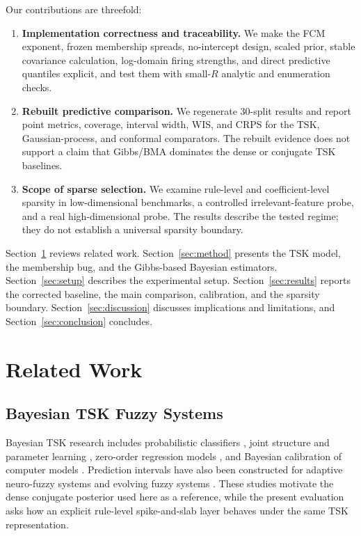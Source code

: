 \documentclass[1p,times]{elsarticle}
\begin{document}
Our contributions are threefold:
\begin{enumerate}
\item \textbf{Implementation correctness and traceability.} We make the FCM exponent, frozen membership spreads, no-intercept design, scaled prior, stable covariance calculation, log-domain firing strengths, and direct predictive quantiles explicit, and test them with small-\(R\) analytic and enumeration checks.
\item \textbf{Rebuilt predictive comparison.} We regenerate 30-split results and report point metrics, coverage, interval width, WIS, and CRPS for the TSK, Gaussian-process, and conformal comparators. The rebuilt evidence does not support a claim that Gibbs/BMA dominates the dense or conjugate TSK baselines.
\item \textbf{Scope of sparse selection.} We examine rule-level and coefficient-level sparsity in low-dimensional benchmarks, a controlled irrelevant-feature probe, and a real high-dimensional probe. The results describe the tested regime; they do not establish a universal sparsity boundary.
\end{enumerate}

Section~\ref{sec:related} reviews related work. Section~\ref{sec:method} presents the TSK model, the membership bug, and the Gibbs-based Bayesian estimators. Section~\ref{sec:setup} describes the experimental setup. Section~\ref{sec:results} reports the corrected baseline, the main comparison, calibration, and the sparsity boundary. Section~\ref{sec:discussion} discusses implications and limitations, and Section~\ref{sec:conclusion} concludes.

\section{Related Work}
\label{sec:related}

\subsection{Bayesian TSK Fuzzy Systems}

Bayesian TSK research includes probabilistic classifiers \cite{gu2017bayesian}, joint structure and parameter learning \cite{gu2018bayesian}, zero-order regression models \cite{liu2017bayesianzero}, and Bayesian calibration of computer models \cite{wang2021bayesian}.
Prediction intervals have also been constructed for adaptive neuro-fuzzy systems and evolving fuzzy systems \cite{miskony2018predictionintervals,cartagena2024evolving}.
These studies motivate the dense conjugate posterior used here as a reference, while the present evaluation asks how an explicit rule-level spike-and-slab layer behaves under the same TSK representation.
\end{document}
